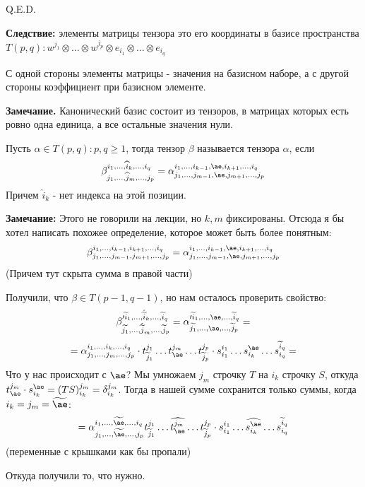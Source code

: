 \hfill Q.E.D.

\textbf{Следствие:} элементы матрицы тензора это его координаты в базисе пространства $T(p,q): w^{j_1}\otimes \ldots\otimes w^{j_p}\otimes e_{i_1}\otimes \ldots \otimes e_{i_q}$

С одной стороны элементы матрицы - значения на базисном наборе, а с другой стороны коэффициент при базисном элементе.


\textbf{Замечание.} Канонический базис состоит из тензоров, в матрицах которых есть ровно одна единица, а все остальные значения нули.

 Пусть $\alpha \in T(p,q): p,q \geq 1$, тогда тензор $\beta$ называется  тензора $\alpha$, если
$$\beta^{i_1,\ldots, \widehat{i}_k,\ldots,i_q}_{j_1,\ldots,\widehat{j}_m,\ldots,j_p} = \alpha_{j_1,\ldots,j_{m-1}, \ae,j_{m+1},\ldots,j_p}^{i_1,\ldots,i_{k-1},\ae, i_{k+1},\ldots,i_q}$$
Причем $\widehat{i}_k$ - нет индекса на этой позиции.

\textbf{Замечание:} Этого не говорили на лекции, но $k,m$ фиксированы. Отсюда я бы хотел написать похожее определение, которое может быть более понятным:
$$\beta_{j_1,\ldots,j_{m-1},j_{m+1},\ldots,j_p}^{i_1,\ldots,i_{k-1},i_{k+1},\ldots,i_q} = \alpha_{j_1,\ldots,j_{m-1}, \ae,j_{m+1},\ldots,j_p}^{i_1,\ldots,i_{k-1},\ae, i_{k+1},\ldots,i_q}$$
(Причем тут скрыта сумма в правой части)

Получили, что $\beta \in T(p-1,q-1)$, но нам осталось проверить свойство:
$$\beta_{\widetilde{j_1},\ldots,\hat{\widetilde{j}}_m,\ldots,\widetilde{j}_p}'^{\widetilde{i}_1,\ldots,\hat{\widetilde{i}}_k,\ldots, \widetilde{i}_q} =\alpha_{\widetilde{j_1},\ldots,\ae,\ldots,\widetilde{j}_p}'^{\widetilde{i}_1,\ldots,\ae,\ldots, \widetilde{i}_q} = $$
$$= \alpha_{j_1,\ldots,j_m,\ldots,j_p}^{i_1,\ldots,i_k,\ldots,i_q} \cdot t_{\widetilde{j}_1}^{j_1}\ldots t^{j_m}_{\ae}\ldots t^{j_p}_{\widetilde{j}_p}\cdot s_{i_1}^{i_1}\ldots s^{\ae}_{i_k}\ldots s_{i_q}^{\widetilde{i}_q} = $$
Что у нас происходит с $\ae$? Мы умножаем $j_m$ строчку $T$ на $i_k$ строчку $S$, откуда $t^{j_m}_{\ae} \cdot s_{i_k}^{\ae} = (TS)_{i_k}^{j_m} =\delta_{i_k}^{j_m}$. Тогда в нашей сумме сохранится только суммы, когда $i_k = j_m = \widetilde{\ae} $:
$$=\alpha_{j_1,\ldots,\widetilde{\ae},\ldots,j_p}^{i_1,\ldots, \widetilde{\ae},\ldots, i_q}t_{\widetilde{j}_1}^{j_1}\ldots \widehat{t^{j_m}_{\ae}}\ldots t^{j_p}_{\widetilde{j}_p}\cdot s_{i_1}^{i_1}\ldots \widehat{s^{\ae}_{i_k}}\ldots s_{i_q}^{\widetilde{i}_q}$$
(переменные с крышками как бы пропали)

Откуда получили то, что нужно.

